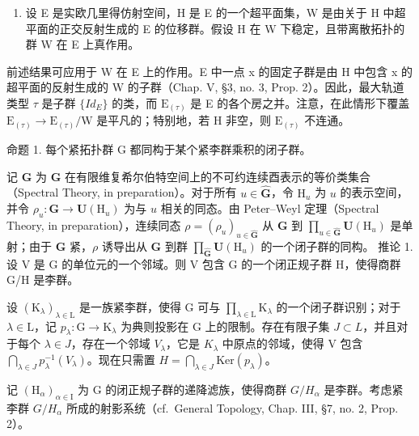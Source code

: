 \begin{enumerate}
\def\labelenumi{\arabic{enumi})}
\setcounter{enumi}{1}
\tightlist
\item
  设 E 是实欧几里得仿射空间，H 是 E 的一个超平面集，W 是由关于 H 中超平面的正交反射生成的 E 的位移群。假设 H 在 W 下稳定，且带离散拓扑的群 W 在 E 上真作用。
\end{enumerate}

前述结果可应用于 W 在 E 上的作用。E 中一点 x 的固定子群是由 H 中包含 x 的超平面的反射生成的 W 的子群（Chap. V, §3, no. 3, Prop. 2）。因此，最大轨道类型 \(\tau\) 是子群 \(\{Id_{E}\}\) 的类，而 \(\mathrm{E}_{(\tau)}\) 是 E 的各个房之并。注意，在此情形下覆盖 \(\mathrm{E}_{(\tau)} \to \mathrm{E}_{(\tau)}/\mathrm{W}\) 是平凡的；特别地，若 H 非空，则 \(\mathrm{E}_{(\tau)}\) 不连通。



命题 1. 每个紧拓扑群 G 都同构于某个紧李群乘积的闭子群。

记 \(\hat{\mathbf{G}}\) 为 \(\mathbf{G}\) 在有限维复希尔伯特空间上的不可约连续酉表示的等价类集合（Spectral Theory, in preparation）。对于所有 \(u\in \hat{\mathbf{G}}\)，令 \(\mathrm{H}_u\) 为 \(u\) 的表示空间，并令 \(\rho_{u}:\mathbf{G}\to \mathbf{U}(\mathrm{H}_{u})\) 为与 \(u\) 相关的同态。由 Peter–Weyl 定理（Spectral Theory, in preparation），连续同态 \(\rho = (\rho_u)_{u\in \hat{\mathbf{G}}}\) 从 \(\mathbf{G}\) 到 \(\prod_{u\in \hat{\mathbf{G}}}\mathbf{U}(\mathrm{H}_u)\) 是单射；由于 \(\mathbf{G}\) 紧，\(\rho\) 诱导出从 \(\mathbf{G}\) 到群 \(\prod_{\hat{\mathbf{G}}} \mathbf{U}(\mathrm{H}_u)\) 的一个闭子群的同构。
推论 1. 设 V 是 G 的单位元的一个邻域。则 V 包含 G 的一个闭正规子群 H，使得商群 G/H 是李群。

设 \((\mathrm{K}_{\lambda})_{\lambda \in \mathrm{L}}\) 是一族紧李群，使得 \(\mathrm{G}\) 可与 \(\prod_{\lambda \in \mathrm{L}}\mathrm{K}_{\lambda}\) 的一个闭子群识别；对于 \(\lambda \in \mathrm{L}\)，记 \(p_{\lambda}:\mathrm{G}\to \mathrm{K}_{\lambda}\) 为典则投影在 G 上的限制。存在有限子集 \(J \subset L\)，并且对于每个 \(\lambda \in J\)，存在一个邻域 \(V_{\lambda}\)，它是 \(K_{\lambda}\) 中原点的邻域，使得 V 包含 \(\bigcap_{\lambda \in J} p_{\lambda}^{-1}(V_{\lambda})\)。现在只需置 \(H = \bigcap_{\lambda \in J} \text{Ker}(p_{\lambda})\)。

记 \((\mathrm{H}_{\alpha})_{\alpha\in\mathrm{I}}\) 为 G 的闭正规子群的递降滤族，使得商群 \(G/H_{\alpha}\) 是李群。考虑紧李群 \(G/H_{\alpha}\) 所成的射影系统（cf.~General Topology, Chap. III, §7, no. 2, Prop. 2）。

